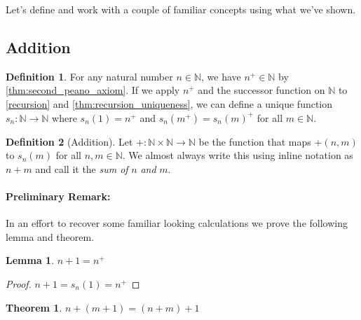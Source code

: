 \documentclass{article}
\theoremstyle{definition}
\newtheorem{definition}{Definition}[section]
\theoremstyle{definition}
\theoremstyle{plain}
\theoremstyle{remark}
\theoremstyle{plain}
\newtheorem{theorem}{Theorem}[section]
\theoremstyle{remark}
\theoremstyle{plain}
\newtheorem{lemma}{Lemma}[section]
\theoremstyle{plain}
\theoremstyle{plain}
\theoremstyle{plain}
\begin{document}
Let's define and work with a couple of familiar concepts using what we've shown.

\subsection{Addition}

\begin{definition}
  For any natural number \( n \in \mathbb{N}\), we have 
  \( n^{+} \in \mathbb{N}\) by \autoref{thm:second_peano_axiom}. If we apply 
  \( n^{+} \) and the successor function on \( \mathbb{N} \) to 
  \autoref{recursion} and 
  \autoref{thm:recursion_uniqueness}, we can define a unique function 
  \( s_n : \mathbb{N} \rightarrow \mathbb{N} \) where
  \( s_n(1) = n^{+} \) and \(s_n(m^{+}) = s_n(m)^{+}\) for all 
  \( m \in \mathbb{N} \). 
  \label{definition:primitive_addition_of_naturals}
\end{definition}

\begin{definition}[Addition]
  Let \( + : \mathbb{N} \times \mathbb{N} \rightarrow \mathbb{N} \) be the 
  function that maps \( +(n, m) \) to \( s_n(m) \) for all 
  \( n, m \in \mathbb{N} \). 
  We almost always write this using inline notation as \( n + m \) and call 
  it the \textit{sum of} \( n \) \textit{and} \(m\). 
  \label{definition:addition_of_naturals}
\end{definition}

\paragraph{Preliminary Remark:}
In an effort to recover some familiar looking calculations we prove the 
following lemma and theorem.

\begin{lemma}
  \( n + 1 = n^{+} \)
  \label{lemma:n_plus_one}
\end{lemma}

\begin{proof}
  \( n + 1 = s_n(1) = n^{+} \)
\end{proof}

\begin{theorem}
  \( n + (m + 1) = (n + m) + 1 \)
\end{theorem}
\end{document}
